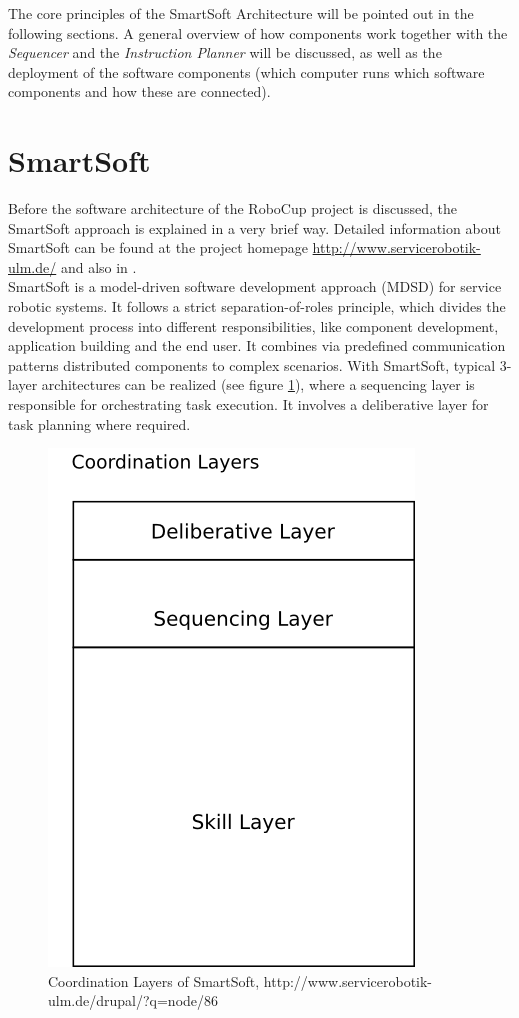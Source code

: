 The core principles of the SmartSoft Architecture will be pointed out in the following
sections. A general overview of how components work together with the \textit{Sequencer} and the \textit{Instruction Planner} will be discussed,
as well as the deployment of the software components (which computer runs which software components and how these are connected).

\section{SmartSoft}
Before the software architecture of the RoboCup project is discussed, the SmartSoft approach is explained in a very brief way. Detailed information about SmartSoft can be found at the project homepage \url{http://www.servicerobotik-ulm.de/} and also in \cite{JOSER}.\\
SmartSoft is a model-driven software development approach (MDSD) for service robotic systems. It follows a strict separation-of-roles principle, which divides the development process into different responsibilities, like component development, application building and the end user. It combines via predefined communication patterns distributed components to complex scenarios.
With SmartSoft, typical 3-layer architectures can be realized (see figure \ref{fig:architecture_smartsoft_layers}), where a sequencing layer is responsible for orchestrating task execution. It involves a deliberative layer for task planning where required.

\begin{figure}[h]
\centering
\includegraphics[scale=1.0]{pic/coordination_layers_smartsoft.png}
\caption{Coordination Layers of SmartSoft, http://www.servicerobotik-ulm.de/drupal/?q=node/86}
\label{fig:architecture_smartsoft_layers}
\end{figure}

